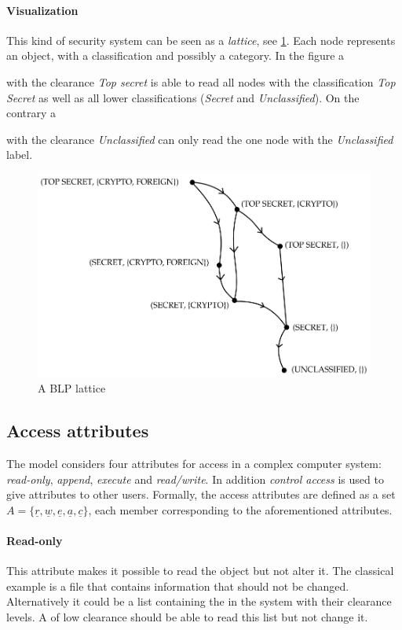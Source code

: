 \paragraph{Visualization}
This kind of security system can be seen as a \textit{lattice}, see \cref{blp:lattice}.
Each node represents an object, with a classification and possibly a category.
In the figure a \subject{} with the clearance \emph{Top secret} is able to read all nodes with the classification \emph{Top Secret} as well as all lower classifications (\emph{Secret} and \emph{Unclassified}).
On the contrary a \subject{} with the clearance \emph{Unclassified} can only read the one node with the \emph{Unclassified} label.

\begin{figure}
\centering
\includegraphics[width=\textwidth]{figures/blp_lattice}
\caption{A BLP lattice \cite{security_engineering_ross_anderson}}
\label{blp:lattice}
\end{figure}

\subsection{Access attributes}
The model considers four attributes for access in a complex computer system: \emph{read-only}, \emph{append}, \emph{execute} and \emph{read/write}.
In addition \emph{control access} is used to give attributes to other users.
Formally, the access attributes are defined as a set $A = \{ \underline{r}, \underline{w}, \underline{e}, \underline{a}, \underline{c} \}$, each member corresponding to the aforementioned attributes.

\paragraph{Read-only}
This attribute makes it possible to read the object but not alter it.
The classical example is a file that contains information that should not be changed.
Alternatively it could be a list containing the \principals{} in the system with their clearance levels.
A \principal{} of low clearance should be able to read this list but not change it.

